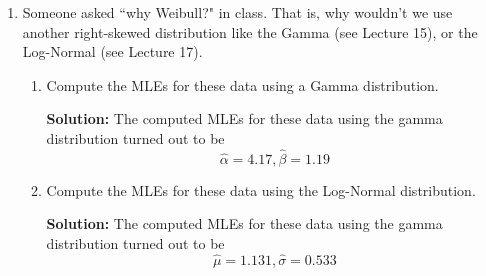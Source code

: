 \documentclass{article}\usepackage[]{graphicx}\usepackage[]{xcolor}
\begin{document}
\begin{enumerate}
  \item Someone asked ``why Weibull?" in class. That is, why wouldn't we use 
  another right-skewed distribution like the Gamma (see Lecture 15), or
  the Log-Normal (see Lecture 17).
  \begin{enumerate}
    \item Compute the MLEs for these data using a Gamma distribution.

\textbf{Solution:} The computed MLEs for these data using the gamma distribution turned out to be \[\hat{\alpha}=4.17, \hat{\beta}=1.19\]
    
    \item Compute the MLEs for these data using the Log-Normal distribution.
    
  \textbf{Solution:} The computed MLEs for these data using the gamma distribution turned out to be \[\hat{\mu}=1.131, \hat{\sigma}=0.533\]
    

\end{enumerate}
\end{enumerate}
\end{document}
